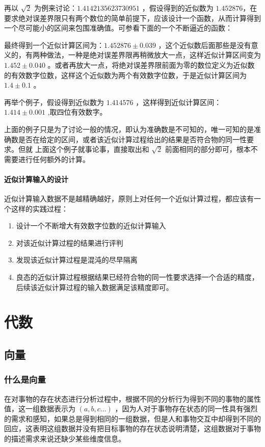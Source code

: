 \documentclass[12pt,oneside]{book}
\begin{document}
再以 $\sqrt{2}$ 为例来讨论：$ 1.4142135623730951 $ ，假设得到的近似数为 $ 1.452876 $，在要求绝对误差界限只有两个数位的简单前提下，应该设计一个函数，从而计算得到一个尽可能小的区间来包围准确值。可参看下面的一个不断逼近的函数：


最终得到一个近似计算区间为：$ 1.452876 \pm 0.039$ ，这个近似数后面那些是没有意义的，有两种做法，一种是绝对误差界限再稍微放大一点，这样近似计算区间变为 $ 1.452 \pm 0.040 $ 。或者再放大一点，将绝对误差界限前面为零的数位定义为近似数的有效数字位数，这样这个近似数为两个有效数字位数，于是近似计算区间为 $ 1.4 \pm 0.1 $ 。

再举个例子，假设得到近似数为 $ 1.414576 $ ，这样得到近似计算区间：$ 1.414 \pm 0.001 $ ,取四位有效数字。

上面的例子只是为了讨论一般的情况，即认为准确数是不可知的，唯一可知的是准确数是否在给定的区间，或者该近似计算过程给出的结果是否符合物的同一性要求。但就 上面这个例子就事论事，直接取出和 $ \sqrt{2} $ 前面相同的部分即可，根本不需要进行任何额外的计算。


\subsection{近似计算输入的设计}
近似计算输入数据不是越精确越好，原则上对任何一个近似计算过程，都应该有一个这样的实践过程：

\begin{enumerate}
\item 设计一个不断增大有效数字位数的近似计算输入
\item 对该近似计算过程的结果进行评判
\item 发现该近似计算过程是混沌的尽早隔离
\item 良态的近似计算过程根据结果已经符合物的同一性要求选择一个合适的精度，后续该近似计算过程的输入数据满足该精度即可。
\end{enumerate}




\part{代数}
\chapter{向量}
\section{什么是向量}
在对事物的存在状态进行分析过程中，根据不同的分析行为得到不同的事物的属性值，这一组数据表示为 $(a, b, c...)$ ，因为人对于事物存在状态的同一性具有强烈的需求和感知，如果总是得到相同的一组数据，但是人和事物交互中却得到不同的回应，这表明这组数据并没有把目标事物的存在状态说明清楚，这组数据对于事物的描述需求来说还缺少某些维度信息。
\end{document}
